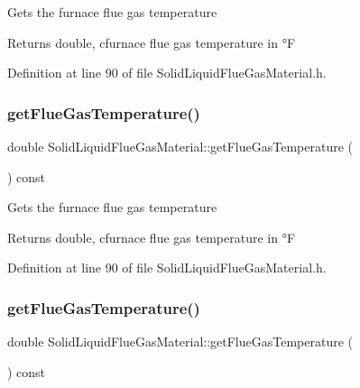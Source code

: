 Gets the furnace flue gas temperature \begin{DoxyReturn}{Returns}
double, cfurnace flue gas temperature in °F 
\end{DoxyReturn}


Definition at line 90 of file Solid\+Liquid\+Flue\+Gas\+Material.\+h.

\mbox{\label{class_solid_liquid_flue_gas_material_aba4604158b3c624496d7de4b5fb511e2}} 
\subsubsection{\texorpdfstring{get\+Flue\+Gas\+Temperature()}{getFlueGasTemperature()}\hspace{0.1cm}{\footnotesize\ttfamily [2/3]}}
{\footnotesize\ttfamily double Solid\+Liquid\+Flue\+Gas\+Material\+::get\+Flue\+Gas\+Temperature (\begin{DoxyParamCaption}{ }\end{DoxyParamCaption}) const\hspace{0.3cm}{\ttfamily [inline]}}

Gets the furnace flue gas temperature \begin{DoxyReturn}{Returns}
double, cfurnace flue gas temperature in °F 
\end{DoxyReturn}


Definition at line 90 of file Solid\+Liquid\+Flue\+Gas\+Material.\+h.

\mbox{\label{class_solid_liquid_flue_gas_material_aba4604158b3c624496d7de4b5fb511e2}} 
\subsubsection{\texorpdfstring{get\+Flue\+Gas\+Temperature()}{getFlueGasTemperature()}\hspace{0.1cm}{\footnotesize\ttfamily [3/3]}}
{\footnotesize\ttfamily double Solid\+Liquid\+Flue\+Gas\+Material\+::get\+Flue\+Gas\+Temperature (\begin{DoxyParamCaption}{ }\end{DoxyParamCaption}) const\hspace{0.3cm}{\ttfamily [inline]}}

